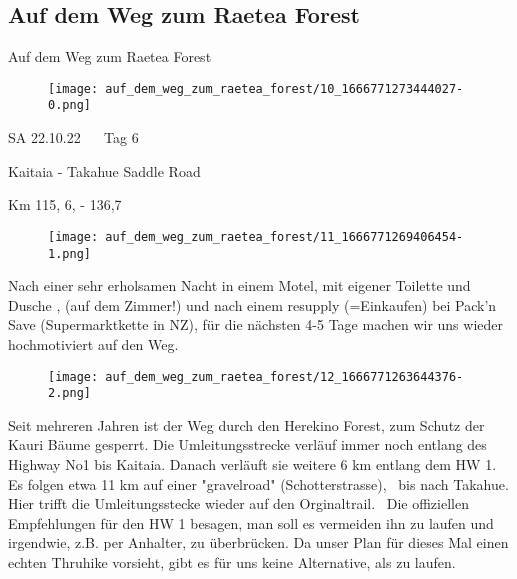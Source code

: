 \subsection{Auf dem Weg zum Raetea Forest}

Auf dem Weg zum Raetea Forest


\begin{figure}[H]
	\centering
	\texttt{[image: auf\_dem\_weg\_zum\_raetea\_forest/10\_1666771273444027-0.png]}
	\caption{}
	\label{fig:10_1666771273444027-0}
\end{figure}

   SA 22.10.22    Tag 6
  


   Kaitaia - Takahue Saddle Road
  


  Km 115, 6, - 136,7
 


\begin{figure}[H]
	\centering
	\texttt{[image: auf\_dem\_weg\_zum\_raetea\_forest/11\_1666771269406454-1.png]}
	\caption{}
	\label{fig:11_1666771269406454-1}
\end{figure}

  Nach einer sehr erholsamen Nacht in einem Motel, mit eigener Toilette und Dusche , (auf dem Zimmer!) und nach einem resupply (=Einkaufen) bei Pack'n Save (Supermarktkette in NZ), für die nächsten 4-5 Tage machen wir uns wieder hochmotiviert auf den Weg.
 


\begin{figure}[H]
	\centering
	\texttt{[image: auf\_dem\_weg\_zum\_raetea\_forest/12\_1666771263644376-2.png]}
	\caption{}
	\label{fig:12_1666771263644376-2}
\end{figure}

  Seit mehreren Jahren ist der Weg durch den Herekino Forest, zum Schutz der Kauri Bäume gesperrt. Die Umleitungsstrecke verläuf immer noch entlang des Highway No1 bis Kaitaia. Danach verläuft sie weitere 6 km entlang dem HW 1. Es folgen etwa 11 km auf einer "gravelroad" (Schotterstrasse),  bis nach Takahue. Hier trifft die Umleitungsstecke wieder auf den Orginaltrail.  Die offiziellen Empfehlungen für den HW 1 besagen, man soll es vermeiden ihn zu laufen und irgendwie, z.B. per Anhalter, zu überbrücken. Da unser Plan für dieses Mal einen echten Thruhike vorsieht, gibt es für uns keine Alternative, als zu laufen.
 


